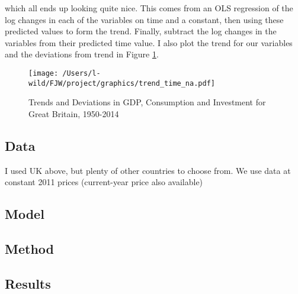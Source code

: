 which all ends up looking quite nice. This comes from an OLS regression of the log changes in each of the variables on time and a constant, then using these
predicted values to form the trend. Finally, subtract the log changes in the variables from their predicted time value. I also plot the trend for our
variables and the deviations from trend in Figure \ref{fig:deviations2}.

\begin{figure}[!htpb]
  \centering
  \caption{Trends and Deviations in GDP, Consumption and Investment for Great Britain, 1950-2014}
  \label{fig:deviations2}
  \texttt{[image: /Users/l-wild/FJW/project/graphics/trend\_time\_na.pdf]}
\end{figure}


\subsection{Data}

I used UK above, but plenty of other countries to choose from. We use data at constant 2011 prices (current-year price also available)

\subsection{Model}



\subsection{Method}

\subsection{Results}





\printbibliography





